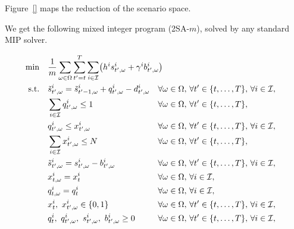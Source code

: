 Figure~\ref{} maps the reduction of the scenario space.


We get the following mixed integer program (2SA-$m$), solved by any standard MIP solver.


\begin{subequations}\label{eq:Uniform-CLSP-BS-2SA-m:backorder}
  \begin{align}
    \min\quad & \rlap{$\ds \frac{1}{m}\sum_{\omega\in\scenarios} \sum_{t'=t}^{\horizon} \sum_{i\in\REF} \bracket{\holding^i\inventory_{t',\omega}^i + \backorder^i\backlog_{t',\omega}^i}$}
    \label{eq:Uniform-CLSP-BS-2SA-m:backorder:objective}
    \\
    \st\quad & \ds \level_{t',\omega}^i = \level_{t'-1,\omega}^i + \quantity_{t',\omega}^i - \demand_{t',\omega}^i && \forall\omega\in\scenarios,\, \forall t'\in\range[t]{\horizon},\, \forall i\in\REF,
    \label{eq:Uniform-CLSP-BS-2SA-m:backorder:inventory-dynamic}
    \\
    & \ds \sum_{i\in\REF} \quantity_{t',\omega}^i \le 1 && \forall\omega\in\scenarios,\, \forall t'\in\range[t]{\horizon},
    \label{eq:Uniform-CLSP-BS-2SA-m:backorder:capacity}
    \\
    & \ds \quantity_{t',\omega}^i \le \setup_{t',\omega}^i && \forall\omega\in\scenarios,\, \forall t'\in\range[t]{\horizon},\, \forall i\in\REF,
    \label{eq:Uniform-CLSP-BS-2SA-m:backorder:big-M}
    \\
    & \ds \sum_{i\in\REF} \setup_{t',\omega}^i \le \nbsetups && \forall\omega\in\scenarios,\, \forall t'\in\range[t]{\horizon},
    \label{eq:Uniform-CLSP-BS-2SA-m:backorder:setups}
    \\
    & \ds \level_{t',\omega}^i = \inventory_{t',\omega}^i - \backlog_{t',\omega}^i && \forall\omega\in\scenarios,\, \forall t'\in\range[t]{\horizon},\, \forall i\in\REF,
    \label{eq:Uniform-CLSP-BS-2SA-m:backorder:inventory}
    \\
    & \ds \setup_{t,\omega}^i = \setup_t^i &&  \forall\omega\in\scenarios,\, \forall i\in\REF,
    \label{eq:Uniform-CLSP-BS-2SA-m:backorder:first-step-setup}
    \\
    & \ds \quantity_{t,\omega}^i = \quantity_t^i &&  \forall\omega\in\scenarios,\, \forall i\in\REF,
    \label{eq:Uniform-CLSP-BS-2SA-m:backorder:first-step-quantity}
    \\
    & \ds \setup_t^i,\ \setup_{t',\omega}^i \in \crbracket{0,1} && \forall\omega\in\scenarios,\, \forall t'\in\range[t]{\horizon},\, \forall i\in\REF,
    \label{eq:Uniform-CLSP-BS-2SA-m:backorder:binary}
    \\
    & \ds \quantity_t^i,\ \quantity_{t',\omega}^i,\ \inventory_{t',\omega}^i,\ \backlog_{t',\omega}^i \ge 0 && \forall\omega\in\scenarios,\, \forall t'\in\range[t]{\horizon},\, \forall i\in\REF,
    \label{eq:Uniform-CLSP-BS-2SA-m:backorder:positity}
  \end{align}
\end{subequations}


